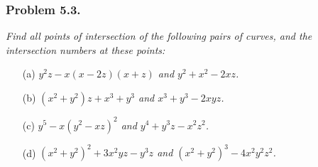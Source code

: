 \documentclass{article}
\begin{document}




\subsubsection*{Problem 5.3.}
\emph{Find all points of intersection of the following pairs of curves,
and the intersection numbers at these points:}
\begin{enumerate}
\item[(a)]
  \emph{$y^2z - x(x-2z)(x+z)$ and $y^2 + x^2 - 2xz$.}

\item[(b)]
  \emph{$(x^2+y^2)z + x^3 + y^3$ and $x^3 + y^3 - 2xyz$.}

\item[(c)]
  \emph{$y^5 - x(y^2-xz)^2$ and $y^4 + y^3z - x^2z^2$.}

\item[(d)]
  \emph{$(x^2+y^2)^2 + 3x^2yz - y^3z$ and $(x^2+y^2)^3 - 4x^2y^2z^2$.} \\
\end{enumerate}
\end{document}
